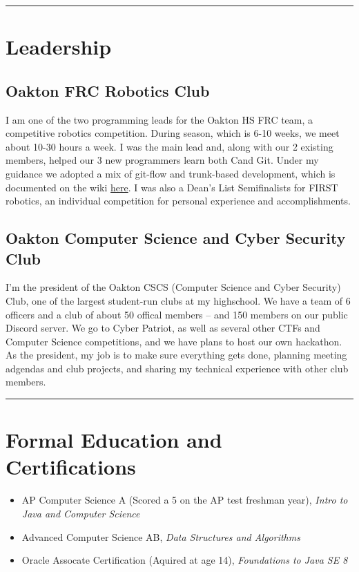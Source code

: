 \documentclass[10pt,letterpaper]{article}
\def\link#1#2{\color{blue!60!black}\href{#1}{#2}\color{black}}
\newcommand{\CPP}
{C\nolinebreak[4]\hspace{-.05em}\raisebox{.35ex}{\footnotesize\bf ++}}
\begin{document}
    \hrule
    \vspace{-0.4em}

    \section*{Leadership}
    \subsection*{Oakton FRC Robotics Club}

    I am one of the two programming leads for the Oakton HS FRC team,
    a competitive robotics competition.
    During season, which is 6-10 weeks, we meet about 10-30 hours a week.
    I was the main lead and, along with our 2 existing members,
    helped our 3 new programmers learn both \CPP and Git.
    Under my guidance we adopted a mix of git-flow and trunk-based development,
    which is documented on the wiki \link{https://github.com/CougarProgramming623/InfiniteRecharge/wiki/Git}{here}.
    I was also a Dean's List Semifinalists for FIRST robotics,
    an individual competition for personal experience and accomplishments.

    \subsection*{Oakton Computer Science and Cyber Security Club}

    I'm the president of the Oakton CSCS (Computer Science and Cyber Security) Club,
    one of the largest student-run clubs at my highschool. 
    We have a team of 6 officers and a club of about 50 offical members -- and 150 members on our public Discord server.
    We go to Cyber Patriot, as well as several other CTFs and Computer Science competitions,
    and we have plans to host our own hackathon.
    As the president, my job is to make sure everything gets done, planning meeting adgendas and club projects,
    and sharing my technical experience with other club members. 

    \vspace{1em}
    \hrule

    \section*{Formal Education and Certifications}
    \begin{itemize}
        \item AP Computer Science A (Scored a 5 on the AP test freshman year), \textit{Intro to Java and Computer Science}
        \item Advanced Computer Science AB, \textit{Data Structures and Algorithms}
        \item Oracle Assocate Certification (Aquired at age 14), \textit{Foundations to Java SE 8}
    \end{itemize}
\end{document}
